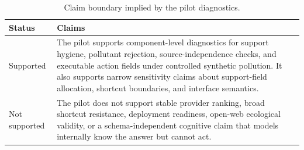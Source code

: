 \begin{table}[t]
    \centering
    \small
    \caption{Claim boundary implied by the pilot diagnostics.}
    \label{tab:claim-boundary-summary}
    \begin{tabularx}{\linewidth}{lX}
        \toprule
        Status & Claims \\
        \midrule
        Supported & The pilot supports component-level diagnostics for support hygiene, pollutant rejection, source-independence checks, and executable action fields under controlled synthetic pollution. It also supports narrow sensitivity claims about support-field allocation, shortcut boundaries, and interface semantics. \\
        Not supported & The pilot does not support stable provider ranking, broad shortcut resistance, deployment readiness, open-web ecological validity, or a schema-independent cognitive claim that models internally know the answer but cannot act. \\
        \bottomrule
    \end{tabularx}
\end{table}
